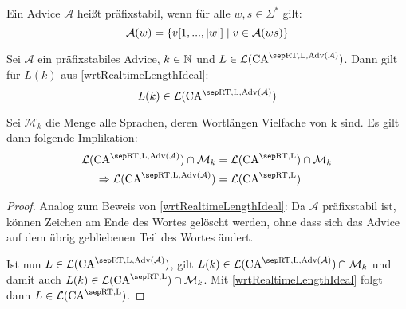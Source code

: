 \begin{comment}
    \begin{satz}
        Es gibt einen Zellularautomaten $C$,
        sodass für $i \in \Z$ und $t \in \Nz$ mit $i - 2 < t < 3*2^{2-i+t}-i$ gilt:
        \[
            (\Delta^{t}_{C}(c_{exp})_i)_e = 1 \Leftrightarrow \exists k \in \Nz: i + t = 2^k
        \]
        Wegen \cref{lemmaNumberTheoryInequality} gilt die Aussage insbesondere,
        falls $i \geq 1$ und $t \geq 2i - 2$.
    \end{satz}
    \begin{proof}
        Nach \cref{linksunabhaengigSpeedup} gibt es einen Zellularautomaten $C$,
        sodass $\Delta^t_{C}(c_{exp})_i = \Delta^{2t}_{C_{exp}}(c_{exp})_{i-t}$.
        Aus den Voraussetzungen folgt, dass $i-t < 2$ und $2t < 3 * 2^{2-(i-t)}-(i-t)$.
        Es gilt damit mit \cref{lemmaCExpProp2}:
        \[
            i + t = (i-t) + 2t = 2^k
            \Leftrightarrow(\Delta^{2t}_{C_{exp}}(c_{exp})_{i-t})_e = 1
            \Leftrightarrow (\Delta^t_{C}(c_{exp})_{i})_e = 1
        \]        
        
    \end{proof}

\end{comment}

\begin{definition}[Präfixstabil]
    Ein Advice $\mathcal{A}$ heißt präfixstabil, wenn für alle $w, s \in \Sigma^*$ gilt:
    \[
        \mathcal{A}(w) =
        \{ { v[1, ..., |w|] } \; | \; { v \in \mathcal{A}(ws) } \}
    \]
\end{definition}

\begin{lemma}
    \label{wrtRealtimeLengthIdealAdvice}
    
    Sei $\mathcal{A}$ ein präfixstabiles Advice, $k \in \mathbb{N}$ und $L \in \CAL{\CART, \CALeft, \orakel({\mathcal{A}})}$.
    Dann gilt für $L(k)$ aus \cref{wrtRealtimeLengthIdeal}:
    \[
        L(k) \in \CAL{\CART, \CALeft, \orakel({\mathcal{A}})}
    \]
    
    Sei $\mathcal{M}_k$ die Menge alle Sprachen, deren Wortlängen Vielfache von k sind.
    Es gilt dann folgende Implikation:
    \begin{align*}
        \CAL{\CART, \CALeft, \orakel({\mathcal{A}})} \cap \mathcal{M}_k  & = \CAL{\CART, \CALeft} \cap \mathcal{M}_k \\
        \Rightarrow
        \CAL{\CART, \CALeft, \orakel({\mathcal{A}})} & = \CAL{\CART, \CALeft}
    \end{align*}
\end{lemma}
\begin{proof}
    Analog zum Beweis von \cref{wrtRealtimeLengthIdeal}:
    Da $\mathcal{A}$ präfixstabil ist, können Zeichen am Ende des Wortes gelöscht werden, ohne dass sich
    das Advice auf dem übrig gebliebenen Teil des Wortes ändert.
    
    Ist nun $L \in \CAL{\CART, \CALeft, \orakel({\mathcal{A}})}$,
    gilt $L(k) \in \CAL{\CART, \CALeft, \orakel({\mathcal{A}})} \cap \mathcal{M}_k$
    und damit auch
    $L(k) \in \CAL{\CART, \CALeft} \cap \mathcal{M}_k$.
    Mit \cref{wrtRealtimeLengthIdeal} folgt dann $L \in \CAL{\CART, \CALeft}$.
\end{proof}


